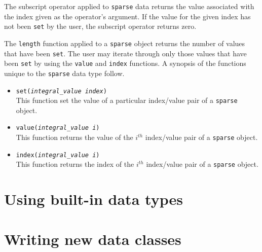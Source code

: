 The subscript operator applied to {\tt sparse} data returns the value associated with the index given as the operator's argument.  If the value for the given index has not been {\tt set} by the user, the subscript operator returns zero.

The {\tt length} function applied to a {\tt sparse} object returns the number of values that have been {\tt set}.  The user may iterate through only those values that have been {\tt set} by using the {\tt value} and {\tt index} functions.  A synopsis of the functions unique to the {\tt sparse} data type follow.
\begin{itemize}
\item {\tt set({\it integral\_value index})} \\
This function set the value of a particular index/value pair of a {\tt sparse} object.

\item {\tt value({\it integral\_value i})} \\
This function returns the value of the $i^{th}$ index/value pair of a {\tt sparse} object.

\item {\tt index({\it integral\_value i})} \\
This function returns the index of the $i^{th}$ index/value pair of a {\tt sparse} object.
\end{itemize}

\section{Using built-in data types}

\section{Writing new data classes}

